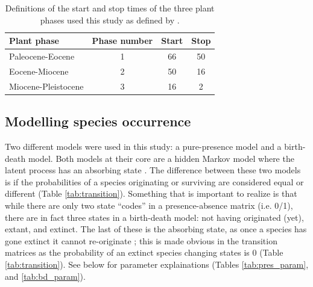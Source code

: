 \documentclass[12pt,letterpaper]{article}
\begin{document}
\begin{table}
  \centering
  \caption[Plant phase defintions]{Definitions of the start and stop times of the three plant phases used this study as defined by \citet{Graham2011a}.}
  \label{tab:plant_def}
  \begin{tabular}{l c c c}
    Plant phase & Phase number & Start & Stop \\
    \hline
    Paleocene-Eocene & 1 & 66 & 50 \\
    Eocene-Miocene & 2 & 50 & 16 \\
    Miocene-Pleistocene & 3 & 16 & 2 \\
  \end{tabular}
\end{table}


\subsection*{Modelling species occurrence}
Two different models were used in this study: a pure-presence model and a birth-death model. Both models at their core are a hidden Markov model where the latent process has an absorbing state \citep{Allen2011}. The difference between these two models is if the probabilities of a species originating or surviving are considered equal or different (Table \ref{tab:transition}). Something that is important to realize is that while there are only two state ``codes'' in a presence-absence matrix (i.e. 0/1), there are in fact three states in a birth-death model: not having originated (yet), extant, and extinct. The last of these is the absorbing state, as once a species has gone extinct it cannot re-originate \citep{Allen2011}; this is made obvious in the transition matrices as the probability of an extinct species changing states is 0 (Table \ref{tab:transition}). See below for parameter explainations (Tables \ref{tab:pres_param}, and \ref{tab:bd_param}).
\end{document}
